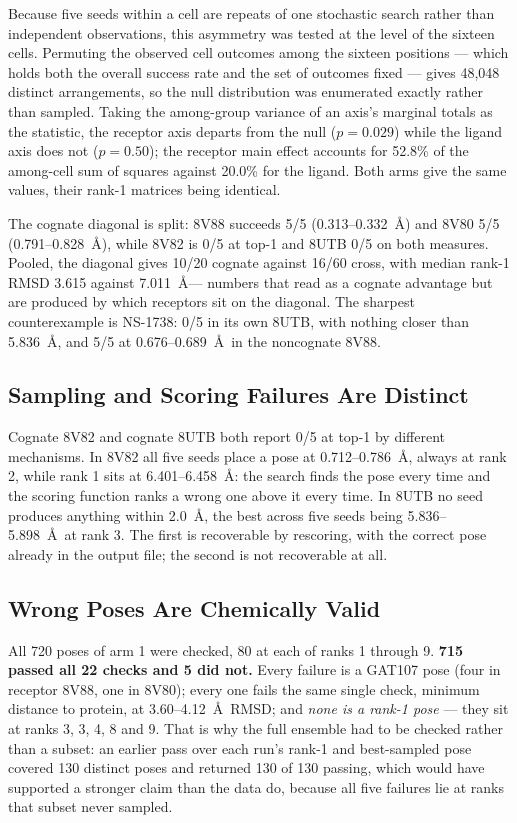 \documentclass[sigconf]{acmart}
\begin{document}
Because five seeds within a cell are repeats of one stochastic search rather than
independent observations, this asymmetry was tested at the level of the sixteen
cells. Permuting the observed cell outcomes among the sixteen positions --- which
holds both the overall success rate and the set of outcomes fixed --- gives
48{,}048 distinct arrangements, so the null distribution was enumerated exactly
rather than sampled. Taking the among-group variance of an axis's marginal totals
as the statistic, the receptor axis departs from the null ($p = 0.029$) while the
ligand axis does not ($p = 0.50$); the receptor main effect accounts for 52.8\% of
the among-cell sum of squares against 20.0\% for the ligand. Both arms give the
same values, their rank-1 matrices being identical.

The cognate diagonal is split: 8V88 succeeds 5/5 (0.313--0.332~\AA) and 8V80 5/5
(0.791--0.828~\AA), while 8V82 is 0/5 at top-1 and 8UTB 0/5 on both measures.
Pooled, the diagonal gives 10/20 cognate against 16/60 cross, with median rank-1
RMSD 3.615 against 7.011~\AA --- numbers that read as a cognate advantage but are
produced by which receptors sit on the diagonal. The sharpest counterexample is
NS-1738: 0/5 in its own 8UTB, with nothing closer than 5.836~\AA, and 5/5 at
0.676--0.689~\AA\ in the noncognate 8V88.

\subsection{Sampling and Scoring Failures Are Distinct}

Cognate 8V82 and cognate 8UTB both report 0/5 at top-1 by different mechanisms. In
8V82 all five seeds place a pose at 0.712--0.786~\AA, always at rank 2, while
rank 1 sits at 6.401--6.458~\AA: the search finds the pose every time and the
scoring function ranks a wrong one above it every time. In 8UTB no seed produces
anything within 2.0~\AA, the best across five seeds being 5.836--5.898~\AA\ at
rank 3. The first is recoverable by rescoring, with the correct pose already in
the output file; the second is not recoverable at all.

\subsection{Wrong Poses Are Chemically Valid}

All 720 poses of arm 1 were checked, 80 at each of ranks 1 through 9.
\textbf{715 passed all 22 checks and 5 did not.} Every failure is a GAT107 pose
(four in receptor 8V88, one in 8V80); every one fails the same single check,
minimum distance to protein, at 3.60--4.12~\AA\ RMSD; and \emph{none is a rank-1
pose} --- they sit at ranks 3, 3, 4, 8 and 9. That is why the full ensemble had to
be checked rather than a subset: an earlier pass over each run's rank-1 and
best-sampled pose covered 130 distinct poses and returned 130 of 130 passing,
which would have supported a stronger claim than the data do, because all five
failures lie at ranks that subset never sampled.
\end{document}
